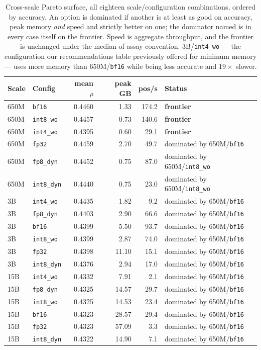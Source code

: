 \documentclass[11pt]{article}
\newcommand{\cfg}[1]{\texttt{#1}}
\begin{document}
\begin{table}[htb]
\centering
\caption{Cross-scale Pareto surface, all eighteen scale/configuration
combinations, ordered by accuracy. An option is dominated if another is at least
as good on accuracy, peak memory \emph{and} speed and strictly better on one;
the dominator named is in every case itself on the frontier. Speed is aggregate
throughput, and the frontier is unchanged under the median-of-assay convention.
3B/\cfg{int4\_wo} --- the configuration our recommendations table previously
offered for minimum memory --- uses more memory than 650M/\cfg{bf16} while being
less accurate and $19\times$ slower.}
\label{tab:pareto}
\small
\begin{tabular}{llrrrl}
\toprule
Scale & Config & mean $\rho$ & peak GB & pos/s & Status \\
\midrule
650M & \cfg{bf16}      & 0.4460 &  1.33 & 174.2 & \textbf{frontier} \\
650M & \cfg{int8\_wo}  & 0.4457 &  0.73 & 140.6 & \textbf{frontier} \\
650M & \cfg{int4\_wo}  & 0.4395 &  0.60 &  29.1 & \textbf{frontier} \\
\addlinespace
650M & \cfg{fp32}      & 0.4459 &  2.70 &  49.7 & dominated by 650M/\cfg{bf16} \\
650M & \cfg{fp8\_dyn}  & 0.4452 &  0.75 &  87.0 & dominated by 650M/\cfg{int8\_wo} \\
650M & \cfg{int8\_dyn} & 0.4440 &  0.75 &  23.0 & dominated by 650M/\cfg{int8\_wo} \\
\addlinespace
3B   & \cfg{int4\_wo}  & 0.4435 &  1.82 &   9.2 & dominated by 650M/\cfg{bf16} \\
3B   & \cfg{fp8\_dyn}  & 0.4403 &  2.90 &  66.6 & dominated by 650M/\cfg{bf16} \\
3B   & \cfg{bf16}      & 0.4399 &  5.50 &  93.7 & dominated by 650M/\cfg{bf16} \\
3B   & \cfg{int8\_wo}  & 0.4399 &  2.87 &  74.0 & dominated by 650M/\cfg{bf16} \\
3B   & \cfg{fp32}      & 0.4398 & 11.10 &  15.1 & dominated by 650M/\cfg{bf16} \\
3B   & \cfg{int8\_dyn} & 0.4376 &  2.94 &  17.0 & dominated by 650M/\cfg{bf16} \\
\addlinespace
15B  & \cfg{int4\_wo}  & 0.4332 &  7.91 &   2.1 & dominated by 650M/\cfg{bf16} \\
15B  & \cfg{fp8\_dyn}  & 0.4325 & 14.57 &  29.7 & dominated by 650M/\cfg{bf16} \\
15B  & \cfg{int8\_wo}  & 0.4325 & 14.53 &  23.4 & dominated by 650M/\cfg{bf16} \\
15B  & \cfg{bf16}      & 0.4323 & 28.57 &  29.4 & dominated by 650M/\cfg{bf16} \\
15B  & \cfg{fp32}      & 0.4323 & 57.09 &   3.3 & dominated by 650M/\cfg{bf16} \\
15B  & \cfg{int8\_dyn} & 0.4322 & 14.90 &   7.1 & dominated by 650M/\cfg{bf16} \\
\bottomrule
\end{tabular}
\end{table}
\end{document}
